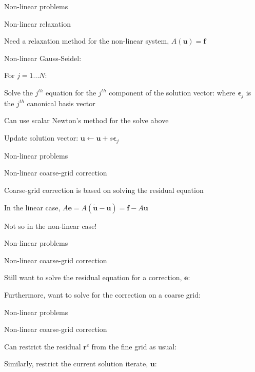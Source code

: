\documentclass[18pt,xcolor=table]{beamer}
\begin{document}
\begin{frame}{Non-linear problems}
\begin{block}{Non-linear relaxation}
\bit
\item Need a relaxation method for the non-linear system, $A(\mathbf{u}) = \mathbf{f}$
\item Non-linear Gauss-Seidel: 
\bit
\item For $j = 1...N$:
\item Solve the $j^{th}$ equation for the $j^{th}$ component of the solution vector:
where $\mathbf{\epsilon}_j$ is the $j^{th}$ canonical basis vector
\item Can use scalar Newton's method for the solve above
\item Update solution vector: $\mathbf{u} \leftarrow \mathbf{u} + s\mathbf{\epsilon}_j$
\eit
\eit
\end{block}
\end{frame}

\begin{frame}{Non-linear problems}
\begin{block}{Non-linear coarse-grid correction}
\bit
\item Coarse-grid correction is based on solving the residual equation
\item In the linear case, $A\mathbf{e} = A(\mathbf{\tilde{u}} - \mathbf{u}) = \mathbf{f} - A\mathbf{u}$
\item Not so in the non-linear case!
\eit
\end{block}
\end{frame}

\begin{frame}{Non-linear problems}
\begin{block}{Non-linear coarse-grid correction}
\bit
\item Still want to solve the residual equation for a correction, $\mathbf{e}$:
\item Furthermore, want to solve for the correction on a coarse grid:
\eit
\end{block}
\end{frame}

\begin{frame}{Non-linear problems}
\begin{block}{Non-linear coarse-grid correction}
\bit
\item Can restrict the residual $\mathbf{r}^c$ from the fine grid as usual:
\item Similarly, restrict the current solution iterate, $\mathbf{u}$:
\eit
\end{block}
\end{frame}
\end{document}
